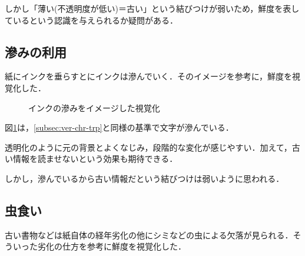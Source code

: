 しかし「薄い(不透明度が低い)＝古い」という結びつけが弱いため，鮮度を表しているという認識を与えられるか疑問がある．

\subsection{滲みの利用}
\label{subsec:ver-chr-bld}

紙にインクを垂らすとにインクは滲んでいく．そのイメージを参考に，鮮度を視覚化した．

\begin{figure}[htbp]
  \begin{center}
  \end{center}
  \caption{インクの滲みをイメージした視覚化}
  \label{fig:ver-bleeding}
\end{figure}

図\ref{fig:ver-bleeding}は，\ref{subsec:ver-chr-trp}と同様の基準で文字が滲んでいる．

透明化のように元の背景とよくなじみ，段階的な変化が感じやすい．加えて，古い情報を読ませないという効果も期待できる．

しかし，滲んでいるから古い情報だという結びつけは弱いように思われる．

\subsection{虫食い}
\label{subsec:ver-chr-wh}

古い書物などは紙自体の経年劣化の他にシミなどの虫による欠落が見られる．そういった劣化の仕方を参考に鮮度を視覚化した．

